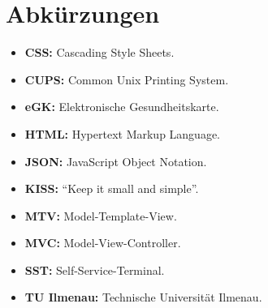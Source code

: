 \section*{Abkürzungen}
\thispagestyle{empty}
\begin{itemize}
    \item \textbf{CSS:} Cascading Style Sheets.
    \item \textbf{CUPS:} Common Unix Printing System.
    \item \textbf{eGK:} Elektronische Gesundheitskarte.
    \item \textbf{HTML:} Hypertext Markup Language.
    \item \textbf{JSON:} JavaScript Object Notation.
    \item \textbf{KISS:} "`Keep it small and simple"'.
    \item \textbf{MTV:} Model-Template-View.
    \item \textbf{MVC:} Model-View-Controller.
    \item \textbf{SST:} Self-Service-Terminal.
    \item \textbf{TU Ilmenau:} Technische Universität Ilmenau.
\end{itemize}{}